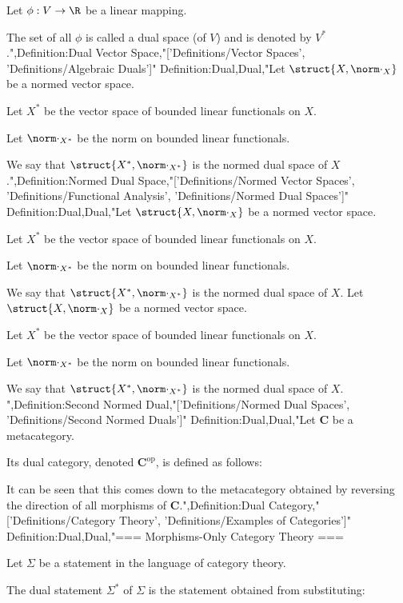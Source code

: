 Let $\phi: V \to \R$ be a linear mapping.


The set of all $\phi$ is called a dual space (of $V$) and is denoted by $V^*$.",Definition:Dual Vector Space,"['Definitions/Vector Spaces', 'Definitions/Algebraic Duals']"
Definition:Dual,Dual,"Let $\struct {X, \norm \cdot_X}$ be a normed vector space.

Let $X^\ast$ be the vector space of bounded linear functionals on $X$. 

Let $\norm \cdot_{X^\ast}$ be the norm on bounded linear functionals.


We say that $\struct {X^\ast, \norm \cdot_{X^\ast} }$ is the normed dual space of $X$.",Definition:Normed Dual Space,"['Definitions/Normed Vector Spaces', 'Definitions/Functional Analysis', 'Definitions/Normed Dual Spaces']"
Definition:Dual,Dual,"Let $\struct {X, \norm \cdot_X}$ be a normed vector space.

Let $X^\ast$ be the vector space of bounded linear functionals on $X$. 

Let $\norm \cdot_{X^\ast}$ be the norm on bounded linear functionals.


We say that $\struct {X^\ast, \norm \cdot_{X^\ast} }$ is the normed dual space of $X$.
Let $\struct {X, \norm \cdot_X}$ be a normed vector space.

Let $X^\ast$ be the vector space of bounded linear functionals on $X$. 

Let $\norm \cdot_{X^\ast}$ be the norm on bounded linear functionals.


We say that $\struct {X^\ast, \norm \cdot_{X^\ast} }$ is the normed dual space of $X$.
",Definition:Second Normed Dual,"['Definitions/Normed Dual Spaces', 'Definitions/Second Normed Duals']"
Definition:Dual,Dual,"Let $\mathbf C$ be a metacategory.


Its dual category, denoted $\mathbf C^{\text{op} }$, is defined as follows:



It can be seen that this comes down to the metacategory obtained by reversing the direction of all morphisms of $\mathbf C$.",Definition:Dual Category,"['Definitions/Category Theory', 'Definitions/Examples of Categories']"
Definition:Dual,Dual,"=== Morphisms-Only Category Theory ===

Let $\Sigma$ be a statement in the language of category theory.

The dual statement $\Sigma^*$ of $\Sigma$ is the statement obtained from substituting:








